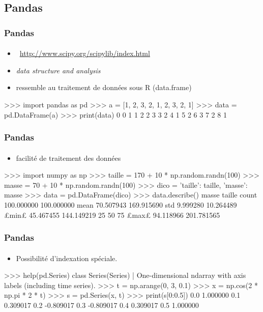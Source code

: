 \subsection{Pandas}
\begin{frame}[fragile]
\frametitle{Pandas}
\framesubtitle{}
\begin{itemize}
 \item {} \, \url{http://www.scipy.org/scipylib/index.html}
 \item \emph{data structure and analysis}
 \item ressemble au traitement de données sous R (data.frame) 
\end{itemize}

\begin{pythonConsole}
>>> import pandas as pd
>>> a = [1, 2, 3, 2, 1, 2, 3, 2, 1]
>>> data = pd.DataFrame(a)
>>> print(data)
   0
0  1
1  2
2  3
3  2
4  1
5  2
6  3
7  2
8  1
\end{pythonConsole}
\end{frame}
\begin{frame}[fragile]
\frametitle{Pandas}
\framesubtitle{}
\begin{itemize}
 \item facilité de traitement des données 
\end{itemize}

\begin{pythonConsole}
>>> import numpy as np
>>> taille = 170 + 10 * np.random.randn(100)
>>> masse = 70 + 10 * np.random.randn(100)
>>> dico = {'taille': taille, 'masse': masse}
>>> data = pd.DataFrame(dico)
>>> data.describe()
            masse      taille
count  100.000000  100.000000
mean    70.507943  169.915690
std      9.999280   10.264489
£min£     45.467455  144.149219
25%
50%
75%
£max£     94.118966  201.781565
\end{pythonConsole}
\end{frame}
\begin{frame}[fragile]
\frametitle{Pandas}
\framesubtitle{}
\begin{itemize}
 \item Possibilité d'indexation spéciale.  
\end{itemize}

\begin{pythonConsole}
>>> help(pd.Series)
class Series(Series)
 |  One-dimensional ndarray with axis labels (including time series).
>>> t = np.arange(0, 3, 0.1)
>>> x = np.cos(2 * np.pi * 2 * t)
>>> s = pd.Series(x, t)
>>> print(s[0:0.5])
0.0    1.000000
0.1    0.309017
0.2   -0.809017
0.3   -0.809017
0.4    0.309017
0.5    1.000000
\end{pythonConsole}
\end{frame}
